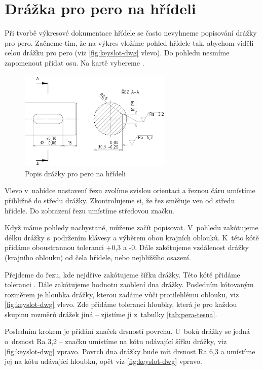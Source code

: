 \section{Drážka pro pero na hřídeli}
Při tvorbě výkresové dokumentace hřídele se často nevyhneme popisování drážky pro pero.
Začneme tím, že na výkres vložíme pohled hřídele tak, abychom viděli celou drážku pro pero (viz \autoref{fig:keyslot-dwg} vlevo).
Do pohledu nesmíme zapomenout přidat osu.
Na kartě  vybereme .
\begin{figure}[htbp]
    \centering
    \includegraphics[width=0.65\textwidth]{img/030 img/perodrazka-hridel-screen.png}
    \caption{Popis drážky pro pero na hřídeli}
    \label{fig:keyslot-dwg}
\end{figure}

Vlevo v~nabídce nastavení řezu zvolíme svislou orientaci a řeznou čáru umístíme přibližně do středu drážky.
Zkontrolujeme si, že řez směřuje ven od středu hřídele.
Do zobrazení řezu umístíme středovou značku.

Když máme pohledy nachystané, můžeme začít popisovat.
V~pohledu zakótujeme délku drážky s~podržením klávesy  a výběrem obou krajních oblouků.
K~této kótě přidáme oboustrannou toleranci +0,3 a -0.
Dále zakótujeme vzdálenost drážky (krajního oblouku) od čela hřídele, nebo nejbližšího osazení.

Přejdeme do řezu, kde nejdříve zakótujeme šířku drážky.
Této kótě přidáme toleranci .
Dále zakótujeme hodnotu zaoblení dna drážky.
Posledním kótovaným rozměrem je hloubka drážky, kterou zadáme vůči protilehlému oblouku, viz \autoref{fig:keyslot-dwg} vlevo.
Zde přidáme toleranci hloubky, která je pro každou skupinu rozměrů drážek jiná -- zjistíme ji z~tabulky \ref{tab:pera-tesna}.

Posledním krokem je přidání značek drsností povrchu.
U~boků drážky se jedná o~drsnost Ra 3,2 -- značku umístíme na kótu udávající šířku drážky, viz \autoref{fig:keyslot-dwg}  vpravo.
Povrch dna drážky bude mít drsnost Ra 6,3 a umístíme jej na kótu udávající hloubku, opět viz \autoref{fig:keyslot-dwg}  vpravo.

